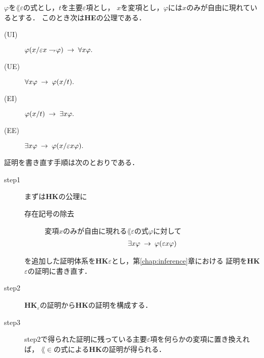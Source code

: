 	\begin{screen}
		\begin{logicalaxm}[{\bf HE}の公理(量化)]
			$\varphi$を$\lang{\varepsilon}の$式とし，$t$を主要$\varepsilon$項とし，
			$x$を変項とし，$\varphi$には$x$のみが自由に現れているとする．
			このとき次は{\bf HE}の公理である．
			\begin{description}
				\item[(UI)] $\varphi(x/\varepsilon x \rightharpoondown\hspace{-0.25em} \varphi)
					\hspace{0.25em}\rightarrow\hspace{0.25em} \forall x \varphi.$
				
				\item[(UE)] $\forall x \varphi \hspace{0.25em}\rightarrow\hspace{0.25em} \varphi(x/t).$
				
				\item[(EI)] $\varphi(x/t) \hspace{0.25em}\rightarrow\hspace{0.25em} \exists x \varphi.$
				
				\item[(EE)] $\exists x \varphi \hspace{0.25em}\rightarrow\hspace{0.25em} \varphi(x/\varepsilon x \varphi).$
			\end{description}
		\end{logicalaxm}
	\end{screen}
	
	証明を書き直す手順は次のとおりである．
	
	\begin{description}
		\item[step1]
			まずは{\bf HK}の公理に
			\begin{description}
				\item[存在記号の除去] 
					変項$x$のみが自由に現れる$\lang{\varepsilon}$の式$\varphi$に対して
					\begin{align}
						\exists x \varphi \hspace{0.25em}\rightarrow\hspace{0.25em} \varphi(\varepsilon x \varphi)
					\end{align}
			\end{description}
			を追加した証明体系を{\bf HK$\varepsilon$}とし，第\ref{chap:inference}章における
			証明を{\bf HK$\varepsilon$}の証明に書き直す．
			
		\item[step2]
			{\bf HK}${}_\varepsilon$の証明から{\bf HK}の証明を構成する．
			
		\item[step3]
			step2で得られた証明に残っている主要$\varepsilon$項を何らかの変項に置き換えれば，
			$\lang{\in}$の式による{\bf HK}の証明が得られる．
	\end{description}
	
